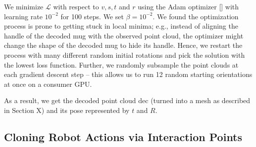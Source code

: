 \documentclass{article}
\begin{document}
We minimize $\mathcal{L}$ with respect to $v, s, t$ and $r$ using the Adam optimizer [] with learning rate $10^{-2}$ for 100 steps. We set $\beta=10^{-2}$. We found the optimization process is prone to getting stuck in local minima; e.g., instead of aligning the handle of the decoded mug with the observed point cloud, the optimizer might change the shape of the decoded mug to hide its handle. Hence, we restart the process with many different random initial rotations and pick the solution with the lowest loss function. Further, we randomly subsample the point clouds at each gradient descent step -- this allows us to run 12 random starting orientations at once on a consumer GPU.

As a result, we get the decoded point cloud $\mathrm{dec}$ (turned into a mesh as described in Section X) and its pose represented by $t$ and $R$.

\subsection{Cloning Robot Actions via Interaction Points}
\end{document}
